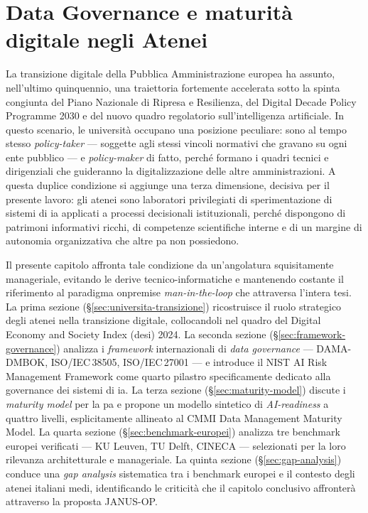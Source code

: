\chapter{Data Governance e maturità digitale negli Atenei}
\label{chap:data-governance}

La transizione digitale della Pubblica Amministrazione europea ha assunto, nell'ultimo
quinquennio, una traiettoria fortemente accelerata sotto la spinta congiunta del Piano
Nazionale di Ripresa e Resilienza, del Digital Decade Policy Programme 2030 e del nuovo
quadro regolatorio sull'intelligenza artificiale. In questo scenario, le università
occupano una posizione peculiare: sono al tempo stesso \textit{policy-taker} ---
soggette agli stessi vincoli normativi che gravano su ogni ente pubblico --- e
\textit{policy-maker} di fatto, perché formano i quadri tecnici e dirigenziali che
guideranno la digitalizzazione delle altre amministrazioni. A questa duplice condizione
si aggiunge una terza dimensione, decisiva per il presente lavoro: gli atenei sono
laboratori privilegiati di sperimentazione di sistemi di \gls{ia} applicati a processi
decisionali istituzionali, perché dispongono di patrimoni informativi ricchi, di
competenze scientifiche interne e di un margine di autonomia organizzativa che altre
\gls{pa} non possiedono.

Il presente capitolo affronta tale condizione da un'angolatura squisitamente
manageriale, evitando le derive tecnico-informatiche e mantenendo costante il riferimento
al paradigma \gls{onpremise} \textit{man-in-the-loop} che attraversa l'intera tesi.
La prima sezione (\S\ref{sec:universita-transizione}) ricostruisce il ruolo strategico
degli atenei nella transizione digitale, collocandoli nel quadro del Digital Economy and
Society Index (\gls{desi}) 2024. La seconda sezione (\S\ref{sec:framework-governance})
analizza i \textit{framework} internazionali di \textit{data governance} ---
DAMA-DMBOK, ISO/IEC\,38505, ISO/IEC\,27001 --- e introduce il NIST AI Risk Management
Framework come quarto pilastro specificamente dedicato alla governance dei sistemi di \gls{ia}.
La terza sezione (\S\ref{sec:maturity-model}) discute i \textit{maturity model} per la \gls{pa}
e propone un modello sintetico di \textit{AI-readiness} a quattro livelli, esplicitamente
allineato al CMMI Data Management Maturity Model. La quarta sezione
(\S\ref{sec:benchmark-europei}) analizza tre benchmark europei verificati ---
KU Leuven, TU Delft, CINECA --- selezionati per la loro rilevanza architetturale e
manageriale. La quinta sezione (\S\ref{sec:gap-analysis}) conduce una \textit{gap
analysis} sistematica tra i benchmark europei e il contesto degli atenei italiani medi,
identificando le criticità che il capitolo conclusivo affronterà attraverso la proposta
JANUS-OP.

